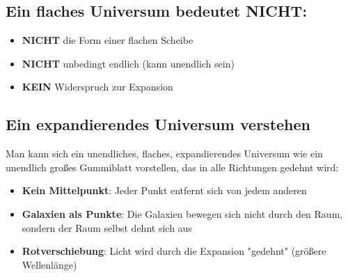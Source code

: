 \documentclass[a4paper,12pt]{article}
\begin{document}
	\subsection{Ein flaches Universum bedeutet NICHT:}
	
	\begin{itemize}
		\item \textbf{NICHT} die Form einer flachen Scheibe
		\item \textbf{NICHT} unbedingt endlich (kann unendlich sein)
		\item \textbf{KEIN} Widerspruch zur Expansion
	\end{itemize}
	
	\subsection{Ein expandierendes Universum verstehen}
	
	Man kann sich ein unendliches, flaches, expandierendes Universum wie ein unendlich großes Gummiblatt vorstellen, das in alle Richtungen gedehnt wird:
	
	\begin{itemize}
		\item \textbf{Kein Mittelpunkt}: Jeder Punkt entfernt sich von jedem anderen
		\item \textbf{Galaxien als Punkte}: Die Galaxien bewegen sich nicht durch den Raum, sondern der Raum selbst dehnt sich aus
		\item \textbf{Rotverschiebung}: Licht wird durch die Expansion "gedehnt" (größere Wellenlänge)
	\end{itemize}
	
\end{document}
